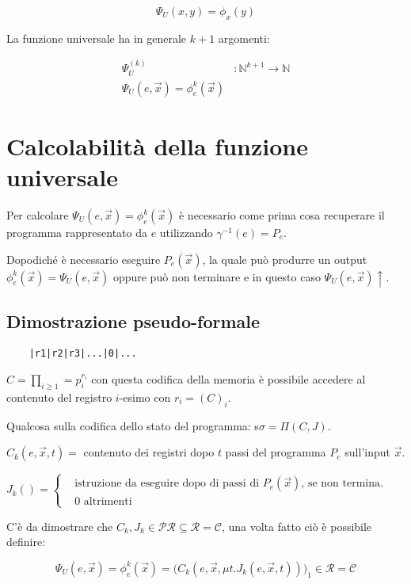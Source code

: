 $$
\Psi_U(x,y) = \phi_{x}(y)
$$

La funzione universale ha in generale $ k+1 $ argomenti:

\begin{align*}
\Psi_U^{(k)} &: \mathbb{N}^{k+1} \rightarrow \mathbb{N} \\
\Psi_U(e, \vec{x}) = \phi_{e}^{k}(\vec{x})
\end{align*}

\section{Calcolabilità della funzione universale}

Per calcolare $ \Psi_U(e, \vec{x}) = \phi_{e}^{k}(\vec{x}) $ è necessario come prima cosa recuperare il programma rappresentato da $ e $ utilizzando $ \gamma^{-1}(e) = P_e$.

Dopodiché è necessario eseguire $ P_e(\vec{x}) $, la quale può produrre un output $\phi_{e}^{k}(\vec{x}) = \Psi_U(e, \vec{x}) $ oppure può non terminare e in questo caso $ \Psi_U(e, \vec{x})\uparrow $.

\subsection{Dimostrazione pseudo-formale}

\begin{verbatim}
	|r1|r2|r3|...|0|...
\end{verbatim}

$ C = \prod_{i \geq 1} = p_{i}^{r_i} $ con questa codifica della memoria è possibile accedere al contenuto del registro $ i $-esimo con $ r_i = (C)_i$.

Qualcosa sulla codifica dello stato del programma: s$ \sigma = \Pi(C,J) $.

$ C_k(e,\vec{x}, t)  = $ contenuto dei registri dopo $ t $ passi del programma $ P_e $ sull'input $ \vec{x} $.

$ J_k() = \begin{cases}
&\text{istruzione da eseguire dopo di passi di } P_e(\vec{x}) \text{, se non termina.}\\
&0 \text{ altrimenti}
\end{cases} $ 

C'è da dimostrare che $ C_k, J_k \in \mathcal{PR} \subseteq \mathcal{R}  = \mathcal{C}$, una volta fatto ciò è possibile definire:

$$
\Psi_U(e, \vec{x}) = \phi_{e}^{k}(\vec{x}) = \Big( C_k(e,\vec{x}, \mu t.J_k(e,\vec{x},t)) \Big)_1 \in \mathcal{R} = \mathcal{C}
$$

